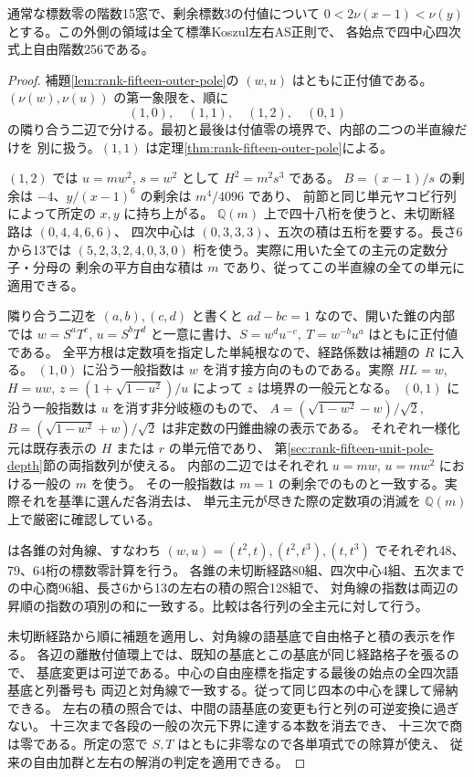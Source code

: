\begin{theorem}\label{thm:rank-fifteen-outer-pole-fan}
通常な標数零の階数15窓で、剰余標数3の付値について
$0<2\nu(x-1)<\nu(y)$ とする。この外側の領域は全て標準Koszul左右AS正則で、
各始点で四中心四次式上自由階数256である。
\end{theorem}
\begin{proof}
補題\ref{lem:rank-fifteen-outer-pole}の $(w,u)$ はともに正付値である。
$(\nu(w),\nu(u))$ の第一象限を、順に
\[
          (1,0),\quad(1,1),\quad(1,2),\quad(0,1)
\]
の隣り合う二辺で分ける。最初と最後は付値零の境界で、内部の二つの半直線だけを
別に扱う。$(1,1)$ は定理\ref{thm:rank-fifteen-outer-pole}による。

$(1,2)$ では $u=mw^2$, $s=w^2$ として $H^2=m^2s^3$ である。
$B=(x-1)/s$ の剰余は $-4$、$y/(x-1)^6$ の剰余は $m^4/4096$ であり、
前節と同じ単元ヤコビ行列によって所定の $x,y$ に持ち上がる。
$\mathbb Q(m)$ 上で四十八桁を使うと、未切断経路は $(0,4,4,6,6)$、
四次中心は $(0,3,3,3)$、五次の積は五桁を要する。長さ6から13では
$(5,2,3,2,4,0,3,0)$ 桁を使う。実際に用いた全ての主元の定数分子・分母の
剰余の平方自由な積は $m$ であり、従ってこの半直線の全ての単元に適用できる。

隣り合う二辺を $(a,b),(c,d)$ と書くと $ad-bc=1$ なので、開いた錐の内部では
$w=S^a T^c$, $u=S^b T^d$ と一意に書け、$S=w^du^{-c},\ T=w^{-b}u^a$ はともに正付値である。
全平方根は定数項を指定した単純根なので、経路係数は補題の $R$ に入る。
$(1,0)$ に沿う一般指数は $w$ を消す接方向のものである。実際
$HL=w$, $H=uw$, $z=(1+\sqrt{1-u^2})/u$ によって $z$ は境界の一般元となる。
$(0,1)$ に沿う一般指数は $u$ を消す非分岐極のもので、
$A=(\sqrt{1-w^2}-w)/\sqrt2$, $B=(\sqrt{1-w^2}+w)/\sqrt2$ は非定数の円錐曲線の表示である。
それぞれ一様化元は既存表示の $H$ または $r$ の単元倍であり、
第\ref{sec:rank-fifteen-unit-pole-depth}節の両指数列が使える。
内部の二辺ではそれぞれ $u=mw,\,u=mw^2$ における一般の $m$ を使う。
その一般指数は $m=1$ の剰余でのものと一致する。実際それを基準に選んだ各消去は、
単元主元が尽きた際の定数項の消滅を $\mathbb Q(m)$ 上で厳密に確認している。

 は各錐の対角線、すなわち
$(w,u)=(t^2,t),(t^2,t^3),(t,t^3)$ でそれぞれ48、79、64桁の標数零計算を行う。
各錐の未切断経路80組、四次中心4組、五次までの中心商96組、長さ6から13の左右の積の照合128組で、
対角線の指数は両辺の昇順の指数の項別の和に一致する。比較は各行列の全主元に対して行う。

未切断経路から順に補題を適用し、対角線の語基底で自由格子と積の表示を作る。
各辺の離散付値環上では、既知の基底とこの基底が同じ経路格子を張るので、
基底変更は可逆である。中心の自由座標を指定する最後の始点の全四次語基底と列番号も
両辺と対角線で一致する。従って同じ四本の中心を課して帰納できる。
左右の積の照合では、中間の語基底の変更も行と列の可逆変換に過ぎない。
十三次まで各段の一般の次元下界に達する本数を消去でき、
十三次で商は零である。所定の窓で $S,T$ はともに非零なので各単項式での除算が使え、
従来の自由加群と左右の解消の判定を適用できる。
\end{proof}
